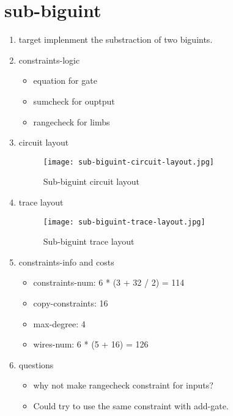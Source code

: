 \section{sub-biguint}
\label{sub-biguint}

\begin{enumerate}
    \item target
        implenment the substraction of two biguints.
    \item constraints-logic
        \begin{itemize}
            \item equation for gate
            \item sumcheck for ouptput 
            \item rangecheck for limbs
        \end{itemize}
    \item circuit layout
        \begin{figure}[!ht]
            \centering
            \texttt{[image: sub-biguint-circuit-layout.jpg]}
            \caption{Sub-biguint circuit layout}
            \label{fig:sub-biguint-circuit-layout}
        \end{figure}

    \item trace layout
        \begin{figure}[!ht]
            \centering
            \texttt{[image: sub-biguint-trace-layout.jpg]}
            \caption{Sub-biguint trace layout}
            \label{fig:sub-biguint-trace-layout}
        \end{figure}
    
    \item constraints-info and costs
        \begin{itemize}
            \item constraints-num: 6 * (3 + 32 / 2) = 114
            \item copy-constraints: 16
            \item max-degree: 4
            \item wires-num: 6 * (5 + 16) = 126
        \end{itemize}

    \item questions
        \begin{itemize}
            \item why not make rangecheck constraint for inputs?
            \item Could try to use the same constraint with add-gate.
        \end{itemize}

\end{enumerate}